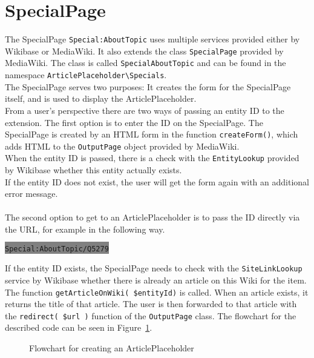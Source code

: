 \section{SpecialPage}

The SpecialPage \texttt{\justify Special:AboutTopic} uses multiple services provided either by Wikibase or MediaWiki. It also extends the class \texttt{\justify SpecialPage} provided by MediaWiki. The class is called \texttt{\justify SpecialAboutTopic} and can be found in the namespace \texttt{\justify ArticlePlaceholder\textbackslash{}Specials}. \\
The SpecialPage serves two purposes: It creates the form for the SpecialPage itself, and is used to display the ArticlePlaceholder. \\
From a user's perspective there are two ways of passing an entity ID to the extension. 
The first option is to enter the ID on the SpecialPage. The SpecialPage is created by an HTML form in the function \texttt{\justify createForm()}, which adds HTML to the \texttt{\justify OutputPage} object provided by MediaWiki. \\
When the entity ID is passed, there is a check with the \texttt{\justify EntityLookup} provided by Wikibase whether this entity actually exists. \\ 
If the entity ID does not exist, the user will get the form again with an additional error message. \\
\\
The second option to get to an ArticlePlaceholder is to pass the ID directly via the URL, for example in the following way.
\begin{center}
\colorbox{Gray}{\lstinline[basicstyle=\ttfamily\color{white}]|Special:AboutTopic/Q5279|}
\end{center}

If the entity ID exists, the SpecialPage needs to check with the \texttt{\justify SiteLinkLookup} service by Wikibase whether there is already an article on this Wiki for the item. The function \texttt{\justify getArticleOnWiki( \$entityId)} is called. When an article exists, it returns the title of that article. The user is then forwarded to that article with the \texttt{\justify redirect( \$url )} function of the \texttt{\justify OutputPage} class.
The flowchart for the described code can be seen in Figure~\ref{fig:createpl}. 
\begin{figure}[H]
	\centering
	
	\caption{Flowchart for creating an ArticlePlaceholder}
	\label{fig:createpl}
\end{figure}

